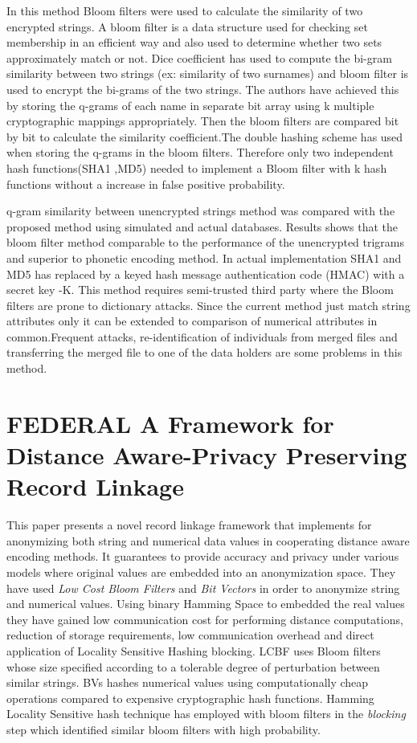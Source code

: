 \documentclass[a4paper]{article}
\begin{document}
In this method Bloom filters were used to calculate the similarity of two encrypted strings. A bloom filter is a data structure used for checking set membership in an efficient way and also used to determine whether two sets approximately match or not. Dice coefficient has used to compute the bi-gram similarity between two strings (ex: similarity of two surnames) and bloom filter is used to encrypt the bi-grams of the two strings. The authors have achieved this by storing the q-grams of each name in separate bit array using k multiple cryptographic mappings appropriately. Then the bloom filters are compared bit by bit to calculate the similarity coefficient.The double hashing scheme has used when storing the q-grams in the bloom filters. Therefore only two independent hash functions(SHA1 ,MD5) needed to implement a Bloom filter with k hash functions without a increase in false positive probability.

q-gram similarity between unencrypted strings method was compared with the proposed method using simulated and actual databases. Results shows that the bloom filter method comparable to the performance of the unencrypted trigrams and  superior to phonetic encoding method. In actual implementation SHA1 and MD5 has replaced by a keyed hash message authentication code (HMAC) with a secret key -K. This method requires semi-trusted third party where the Bloom filters are prone to dictionary attacks. Since the current method just match string attributes only it can be extended to comparison of numerical attributes in common.Frequent attacks, re-identification of individuals from merged files and transferring the merged file to one of the data holders are some problems in this method.   



\section*{FEDERAL A Framework for Distance Aware-Privacy Preserving Record Linkage}
This paper \cite{Karapiperis2017} presents a novel record linkage framework that implements for anonymizing both string and numerical data values in cooperating distance aware encoding methods. It guarantees to provide accuracy and privacy under various models where original values are embedded into an anonymization space. They have used \textit{Low Cost Bloom Filters} and \textit{Bit Vectors } in order to anonymize string and numerical values. Using binary Hamming Space to embedded the real values they have gained low communication cost for performing distance computations, reduction of storage requirements, low communication overhead and direct application of Locality Sensitive Hashing blocking. LCBF uses Bloom filters whose size specified according to a tolerable degree of perturbation between similar strings. BVs hashes numerical values using computationally cheap operations compared to expensive cryptographic hash functions. Hamming Locality Sensitive hash technique has employed with bloom filters in the  \textit{blocking} step which identified similar bloom filters with high probability.
\end{document}
